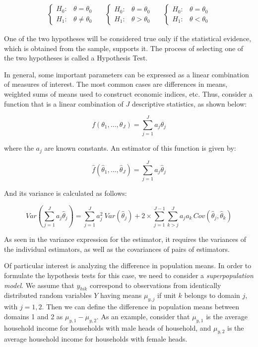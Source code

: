 \documentclass[
  12pt,
]{book}
\begin{document}
\begin{eqnarray*}
\begin{cases}
H_{0}: & \theta=\theta_{0}\\
H_{1}: & \theta\neq\theta_{0}
\end{cases}\,\,\,\,\,\,\,\,\,   
\begin{cases}
H_{0}: & \theta=\theta_{0}\\
H_{1}: & \theta>\theta_{0}
\end{cases}\,\,\,\,\,\,\,\,\,   
\begin{cases}
H_{0}: & \theta=\theta_{0}\\
H_{1}: & \theta<\theta_{0}
\end{cases}
\end{eqnarray*}

One of the two hypotheses will be considered true only if the statistical evidence, which is obtained from the sample, supports it. The process of selecting one of the two hypotheses is called a Hypothesis Test.

In general, some important parameters can be expressed as a linear combination of measures of interest. The most common cases are differences in means, weighted sums of means used to construct economic indices, etc. Thus, consider a function that is a linear combination of \(J\) descriptive statistics, as shown below:

\[
f \left( \theta_{1}, \ldots,\theta_{J}\right) = \sum_{j=1}^{J}a_{j}\theta_{j}
\]

where the \(a_{j}\) are known constants. An estimator of this function is given by:

\[
\widehat{f} \left( \widehat{\theta}_{1}, \ldots, \widehat{\theta}_{J} \right) = \sum_{j=1}^{J} a_{j} \widehat{\theta}_{j}
\]

And its variance is calculated as follows:

\[
Var \left( \sum_{j=1}^{J} a_{j} \widehat{\theta}_{j} \right) = \sum_{j=1}^{J} a_{j}^{2} \ Var\left( \widehat{\theta}_{j} \right) + 2 \times \sum_{j=1}^{J-1} \sum_{k>j}^{J} a_{j} a_{k} \, Cov \left( \widehat{\theta}_{j} , \widehat{\theta}_{k} \right)
\]

As seen in the variance expression for the estimator, it requires the variances of the individual estimators, as well as the covariances of pairs of estimators.

Of particular interest is analyzing the difference in population means. In order to formulate the hypothesis tests for this case, we need to consider a \emph{superpopulation model}. We assume that \(y_{hik}\) correspond to observations from identically distributed random variables \(Y\) having means \(\mu_{y,j}\) if unit \(k\) belongs to domain \(j\), with \(j = 1, 2\). Then we can define the difference in population means between domains 1 and 2 as \(\mu_{y,1} - \mu_{y,2}\). As an example, consider that \(\mu_{y,1}\) is the average household income for households with male heads of household, and \(\mu_{y,2}\) is the average household income for households with female heads.
\end{document}
